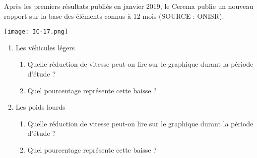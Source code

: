 
Après les premiers résultats publiés en janvier 2019, le Cerema publie un nouveau rapport sur la base des éléments connus à 12 mois (SOURCE : ONISR). 

\begin{center}
\texttt{[image: IC-17.png]}
\end{center}


\begin{enumerate}
 \item Les véhicules légers
 \begin{enumerate}
 \item Quelle réduction de vitesse peut-on lire sur le graphique durant la période d'étude ? 
 \item Quel pourcentage représente cette baisse ? 
 \end{enumerate}  
\item Les poids lourds
 \begin{enumerate}
 \item Quelle réduction de vitesse peut-on lire sur le graphique durant la période d'étude ? 
 \item Quel pourcentage représente cette baisse ? 
 \end{enumerate}  
\end{enumerate} 